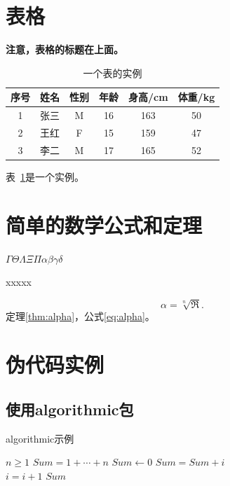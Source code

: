 \section{表格}

\textbf{注意，表格的标题在上面。}
\begin{table}[!ht]
\centering
\caption{一个表的实例}
\begin{tabular}{cccccc}
    \toprule
    序号 & 姓名 & 性别 & 年龄 & 身高/cm & 体重/kg \\
    \midrule
    1 & 张三 & M & 16 & 163 & 50 \\
    2 & 王红 & F & 15 & 159 & 47 \\
    3 & 李二 & M & 17 & 165 & 52 \\
    \bottomrule
\end{tabular}
\label{tab:tabobj}
\end{table}
表~\ref{tab:tabobj}是一个实例。


\section{简单的数学公式和定理}

\begin{sthm}
    $\Gamma\Theta\Lambda\Xi\Pi\alpha\beta\gamma\delta$
\end{sthm}

\begin{thm}
\label{thm:alpha}
    xxxxx
\end{thm}

\begin{equation}
\label{eq:alpha}
    \alpha=\sqrt[n]{\Re}.
\end{equation}
定理\ref{thm:alpha}，公式\ref{eq:alpha}。


\section{伪代码实例}

\subsection{使用algorithmic包}

\begin{algorithm}[!ht]
\caption{algorithmic示例}
\begin{algorithmic}[1] %
    \REQUIRE $n \geq 1$                  %
    \ENSURE $Sum = 1 + \cdots + n$       %
    \STATE $Sum \leftarrow 0$            %
    \ELSE
            \STATE $Sum = Sum + i$\\
            \STATE $i = i + 1$
        \ENDFOR
    \ENDIF
    \RETURN $Sum$
\end{algorithmic}
\label{alg}
\end{algorithm}

